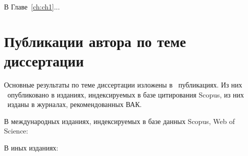 В Главе~\ref{ch:ch1}...

\section*{Публикации автора по теме диссертации}

Основные результаты по теме диссертации изложены в \theAllPapers~публикациях. 
Из них \theScopusPapers~опубликовано в изданиях, индексируемых в базе цитирования Scopus, 
из них \theVakPapers~изданы в журналах, рекомендованных ВАК. 
%

В международных изданиях, индексируемых в базе данных Scopus, Web of Science:
\insertpapperScopus


В иных изданиях:
\insertpapperOther
